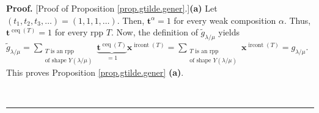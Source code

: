 \documentclass[numbers=enddot,12pt,final,onecolumn,notitlepage]{scrartcl}%
\theoremstyle{definition}
\newenvironment{proof}[1][Proof]{\noindent\textbf{#1.} }{\ \rule{0.5em}{0.5em}}
\let\sumnonlimits\sum
\renewcommand{\sum}{\sumnonlimits\limits}
\begin{document}
\begin{proof}
[Proof of Proposition \ref{prop.gtilde.gener}.]\textbf{(a)} Let $\left(
t_{1},t_{2},t_{3},\ldots\right)  =\left(  1,1,1,\ldots\right)  $. Then,
$\mathbf{t}^{\alpha}=1$ for every weak composition $\alpha$. Thus,
$\mathbf{t}^{\operatorname*{ceq}\left(  T\right)  }=1$ for every rpp $T$. Now,
the definition of $\widetilde{g}_{\lambda/\mu}$ yields $\widetilde{g}%
_{\lambda/\mu}=\sum_{\substack{T\text{ is an rpp}\\\text{of shape }Y\left(
\lambda/\mu\right)  }}\underbrace{\mathbf{t}^{\operatorname*{ceq}\left(
T\right)  }}_{=1}\mathbf{x}^{\operatorname*{ircont}\left(  T\right)  }%
=\sum_{\substack{T\text{ is an rpp}\\\text{of shape }Y\left(  \lambda
/\mu\right)  }}\mathbf{x}^{\operatorname*{ircont}\left(  T\right)
}=g_{\lambda/\mu}$. This proves Proposition \ref{prop.gtilde.gener}
\textbf{(a)}.


\end{proof}
\end{document}
